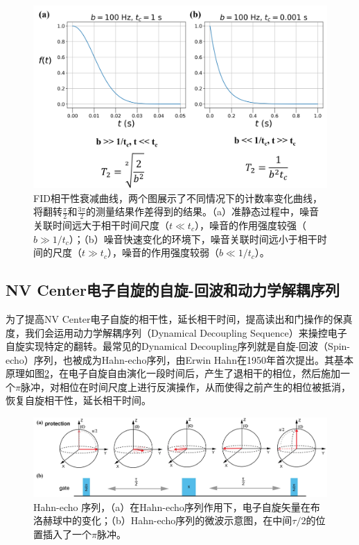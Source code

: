 \documentclass[type = bachelor]{whu-thesis}
\begin{document}
\begin{figure}
  \centering
  \includegraphics[width=1.0\textwidth]{figures/Chapter 1/FID Functions.png}
  \caption[FID相干性衰减曲线]{FID相干性衰减曲线，两个图展示了不同情况下的计数率变化曲线，将翻转$\frac{\pi}{2}$和$\frac{3\pi}{2}$的测量结果作差得到的结果。（a）准静态过程中，噪音关联时间远大于相干时间尺度（$t\ll t_c$），噪音的作用强度较强（$b\gg 1/t_c$）；（b）噪音快速变化的环境下，噪音关联时间远小于相干时间的尺度（$t\gg t_c$），噪音的作用强度较弱（$b\ll 1/t_c$）。}
  \label{fig: FID Functions}
\end{figure}

\subsection{NV Center电子自旋的自旋-回波和动力学解耦序列}
为了提高NV Center电子自旋的相干性，延长相干时间，提高读出和门操作的保真度，我们会运用动力学解耦序列（Dynamical Decoupling Sequence）来操控电子自旋实现特定的翻转。最常见的Dynamical Decoupling序列就是自旋-回波（Spin-echo）序列，也被成为Hahn-echo序列，由Erwin Hahn在1950年首次提出\cite{hahn1950spin}。其基本原理如图\ref{fig: Hahn Sequence}，在电子自旋自由演化一段时间后，产生了退相干的相位，然后施加一个$\pi$脉冲，对相位在时间尺度上进行反演操作，从而使得之前产生的相位被抵消，恢复自旋相干性，延长相干时间。
\begin{figure}
  \centering
  \includegraphics[width=1.0\textwidth]{figures/Chapter 1/Hahn Sequence.png}
  \caption[Hahn-echo 序列]{Hahn-echo 序列，（a）在Hahn-echo序列作用下，电子自旋矢量在布洛赫球中的变化；（b）Hahn-echo序列的微波示意图，在中间$\tau/2$的位置插入了一个$\pi$脉冲。\cite{新型扫描量子传感显微镜系统的研发与应用}}
  \label{fig: Hahn Sequence}
\end{figure}
\end{document}
